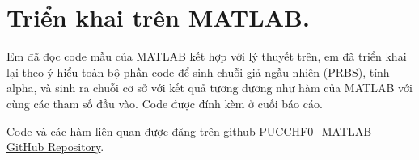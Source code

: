 \section{Triển khai trên MATLAB.}
Em đã đọc code mẫu của MATLAB kết hợp với lý thuyết trên, em đã triển khai lại theo ý hiểu toàn bộ phần code để sinh chuỗi giả ngẫu nhiên (PRBS), tính alpha, và sinh ra chuỗi cơ sở với kết quả tương đương như hàm của MATLAB với cùng các tham số đầu vào. Code được đính kèm ở cuối báo cáo.


Code và các hàm liên quan được đăng trên github \href{https://github.com/ltrnnhdng/PUCCHF0_MATLAB}{PUCCHF0\_MATLAB – GitHub Repository}.

